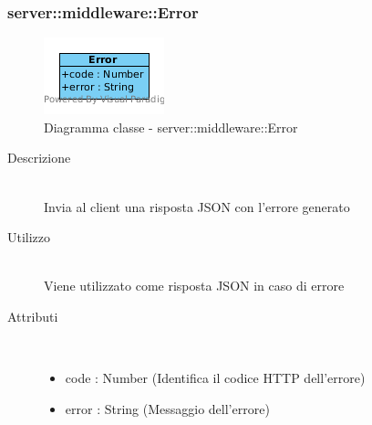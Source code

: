 \vspace{0.5cm}
\hypertarget{server::middleware::Error}{}
\subsubsection[Error]{server::middleware::Error}
\begin{center}
			\begin{figure}[H]
				\centering \includegraphics[scale=4, max width=\textwidth, max height=\myheight]{../img/diagrammiClassi/server/middleware/Error.png}
				\caption{Diagramma classe - server::middleware::Error}
			\end{figure}
		\end{center}\begin{description}
\item[Descrizione] \hfill \\
 Invia al client una risposta JSON con l'errore generato
\item[Utilizzo] \hfill \\
 Viene utilizzato come risposta JSON in caso di errore
\item[Attributi] \hfill \\
 \vspace{-7mm}
\begin{itemize}
\item code : Number (Identifica il codice HTTP dell'errore)
\item error : String (Messaggio dell'errore)
\end{itemize}

\end{description}

\vspace{0.5cm}
